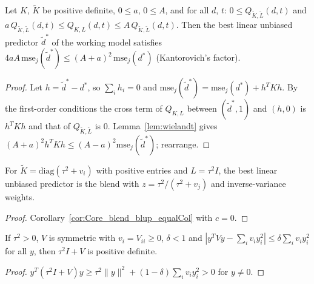 \begin{theorem}\label{thm:Core_working}
  \leanok
  Let $K$, $\tilde K$ be positive definite, $0 \le a$, $0 \le A$, and for all $d$, $t$:
  $0 \le Q_{\tilde K,\tilde L}(d,t)$ and
  $a\,Q_{\tilde K,\tilde L}(d,t) \le Q_{K,L}(d,t) \le A\,Q_{\tilde K,\tilde L}(d,t)$.
  Then the best linear unbiased predictor $\tilde d^*$ of the working model satisfies
  $4aA\,\mathrm{mse}_j(\tilde d^*) \le (A+a)^2\,\mathrm{mse}_j(d^*)$ (Kantorovich's factor).
\end{theorem}
\begin{proof}
  \leanok
  Let $h = \tilde d^* - d^*$, so $\sum_i h_i = 0$ and
  $\mathrm{mse}_j(\tilde d^*) = \mathrm{mse}_j(d^*) + h^TKh$. By the first-order
  conditions the cross term of $Q_{K,L}$ between $(\tilde d^*, 1)$ and $(h, 0)$ is
  $h^TKh$ and that of $Q_{\tilde K,\tilde L}$ is $0$. Lemma~\ref{lem:wielandt} gives
  $(A+a)^2h^TKh \le (A-a)^2\mathrm{mse}_j(\tilde d^*)$; rearrange.
\end{proof}

\begin{lemma}\label{lem:Core_blup_diag}
  \leanok
  For $\tilde K = \mathrm{diag}(\tau^2 + v_i)$ with positive entries and $L = \tau^2I$,
  the best linear unbiased predictor is the blend with $z = \tau^2/(\tau^2 + v_j)$ and
  inverse-variance weights.
\end{lemma}
\begin{proof}
  \leanok
  Corollary~\ref{cor:Core_blend_blup_equalCol} with $c = 0$.
\end{proof}

\begin{lemma}\label{lem:Core_posDef_corr}
  \leanok
  If $\tau^2 > 0$, $V$ is symmetric with $v_i = V_{ii} \ge 0$, $\delta < 1$ and
  $|y^TVy - \sum_i v_iy_i^2| \le \delta\sum_i v_iy_i^2$ for all $y$, then
  $\tau^2I + V$ is positive definite.
\end{lemma}
\begin{proof}
  \leanok
  $y^T(\tau^2I + V)y \ge \tau^2\lVert y\rVert^2 + (1-\delta)\sum_i v_iy_i^2 > 0$ for $y \ne 0$.
\end{proof}

